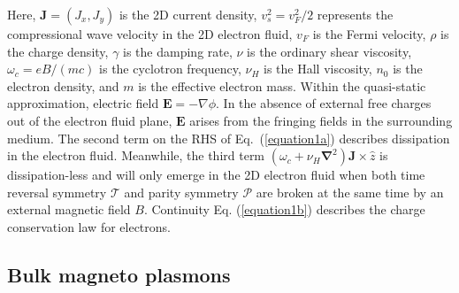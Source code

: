 \documentclass[%
reprint,
amsmath,amssymb,
aps,superscriptaddress
]{revtex4-2}
\begin{document}
Here, $\mathbf{J}=(J_x,J_y)$ is the 2D current density, $v_s^2=v_F^2/2$ represents the compressional wave velocity in the 2D electron fluid, $v_F$ is the Fermi velocity, $\rho$ is the charge density, $\gamma$ is the damping rate, $\nu$ is the ordinary shear viscosity, $\omega_c=eB/(mc)$ is the cyclotron frequency, $\nu_H$ is the Hall viscosity, $n_0$ is the electron density, and $m$ is the effective electron mass. Within the quasi-static approximation, electric field $\mathbf{E}=-\nabla \phi$. In the absence of external free charges out of the electron fluid plane, $\mathbf{E}$ arises from the fringing fields in the surrounding medium. The second term on the RHS of Eq.~(\ref{equation1a}) describes dissipation in the electron fluid. Meanwhile, the third term $(\omega_c+\nu_H \mathbf{\nabla}^2) \mathbf{J} \times \hat{z}$ is dissipation-less and will only emerge in the 2D electron fluid when both time reversal symmetry $\mathcal{T}$ and parity symmetry $\mathcal{P}$ are broken at the same time by an external magnetic field $B$. Continuity Eq. (\ref{equation1b}) describes the charge conservation law for electrons.

\subsection{Bulk magneto plasmons}
\end{document}
